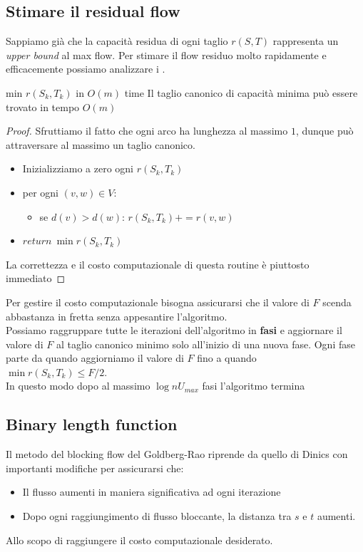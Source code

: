 \documentclass[a4paper, 11pt]{report}
\begin{document}
\subsection{Stimare il residual flow}
    Sappiamo già che la capacità residua di ogni taglio $r(S,T)$ rappresenta un \textit{upper bound} al max flow.
    Per stimare il flow residuo molto rapidamente e efficacemente possiamo analizzare i .

    \begin{lemma}{min $r(S_k,T_k)$ in $O(m)$ time}{}
        Il taglio canonico di capacità minima può essere trovato in tempo $O(m)$
    \end{lemma}
    \begin{proof}
        Sfruttiamo il fatto che ogni arco ha lunghezza al massimo $1$, dunque può attraversare al massimo un taglio canonico.
        \begin{itemize}[noitemsep]
            \item Inizializziamo a zero ogni $r(S_k,T_k)$
            \item per ogni $(v,w) \in V$:
            \begin{itemize}
                \item se $d(v) > d(w)$: $r(S_k,T_k) += r(v,w)$
            \end{itemize}
            \item $return\ \min r(S_k,T_k)$
        \end{itemize}
        La correttezza e il costo computazionale di questa routine è piuttosto immediato
    \end{proof}
    Per gestire il costo computazionale bisogna assicurarsi che il valore di $F$ scenda abbastanza in fretta senza appesantire l'algoritmo.\\
    Possiamo raggruppare tutte le iterazioni dell'algoritmo in \textbf{fasi} e aggiornare il valore di $F$ al taglio canonico minimo solo all'inizio di una nuova fase. 
    Ogni fase parte da quando aggiorniamo il valore di $F$ fino a quando\\$\min r(S_k,T_k)\le F/2$.\\
    In questo modo dopo al massimo $\log nU_{max}$ fasi l'algoritmo termina
\subsection{Binary length function}
    Il metodo del blocking flow del Goldberg-Rao riprende da quello di Dinics con importanti modifiche per assicurarsi che: 
    \begin{itemize}[nolistsep]
        \item Il flusso aumenti in maniera significativa ad ogni iterazione 
        \item Dopo ogni raggiungimento di flusso bloccante, la distanza tra $s$ e $t$ aumenti.
    \end{itemize} 
    Allo scopo di raggiungere il costo computazionale desiderato.
\end{document}
